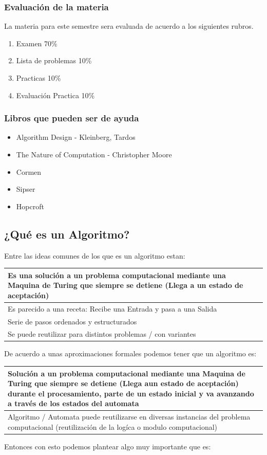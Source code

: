 \documentclass[10pt,executivepaper]{article}
\begin{document}
\subsubsection{Evaluación de la materia}
La materia para este semestre sera evaluada de acuerdo a los siguientes rubros.
 \renewcommand{\labelenumi}{\Roman{enumi}}
\begin{enumerate}

	\item Examen 70\%
	\item Lista de problemas 10\%
	\item Practicas 10\%
	\item Evaluación Practica 10\%
\end{enumerate}
\subsubsection{Libros que pueden ser de ayuda}
\begin{itemize}
	\item Algorithm Design - Kleinberg, Tardos
	\item The Nature of Computation - Christopher Moore
	\item Cormen
	\item Sipser
	\item Hopcroft
\end{itemize}
\subsection{¿Qué es un Algoritmo?}
Entre las ideas comunes de los que es un algoritmo estan:
\begin{center}
	\begin{tabular}{|p{11cm}|}
		\hline
		Es una solución a un problema computacional mediante una Maquina de Turing que siempre se detiene (Llega a un estado de aceptación)\\
		\hline
		Es parecido a una receta: Recibe una Entrada y pasa a una Salida\\
		\hline
		Serie de pasos ordenados y estructurados\\
		\hline
		Se puede reutilizar para distintos problemas / con variantes\\
		\hline
	\end{tabular}
\end{center}
De acuerdo a unas aproximaciones formales podemos tener que un algoritmo es:
\begin{center}
	\begin{tabular}{|p{11cm}|}
		\hline
		Solución a un problema computacional mediante una Maquina de Turing que siempre se detiene (Llega aun estado de aceptación) durante el procesamiento, parte de un estado inicial y va avanzando a través de los estados del automata\\
		\hline
		Algoritmo / Automata puede reutilizarse en diversas instancias del problema computacional (reutilización de la logíca o modulo computacional)\\
		\hline
	\end{tabular}
\end{center}
Entonces con esto podemos plantear algo muy importante que es:
\end{document}
